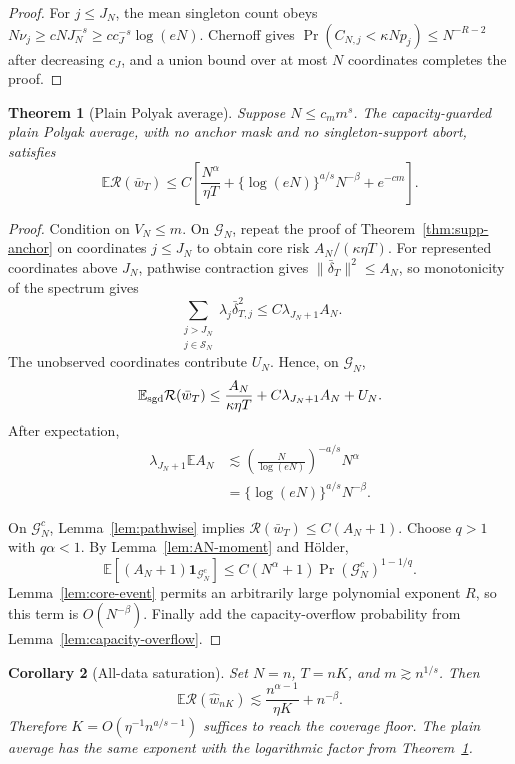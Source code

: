 \documentclass[letterpaper]{article}
\newtheorem{theorem}{Theorem}
\newtheorem{corollary}[theorem]{Corollary}
\newcommand{\E}{\mathbb E}
\newcommand{\R}{\mathcal R}
\newcommand{\cS}{\mathcal S}
\newcommand{\1}{\mathbf 1}
\begin{document}
\begin{proof}
For $j\le J_N$, the mean singleton count obeys
$N\nu_j\ge cN J_N^{-s}\ge c c_J^{-s}\log(eN)$. Chernoff gives
$\Pr(C_{N,j}<\kappa Np_j)\le N^{-R-2}$ after decreasing $c_J$, and a union
bound over at most $N$ coordinates completes the proof.
\end{proof}

\begin{theorem}[Plain Polyak average]
\label{thm:supp-plain}
Suppose $N\le c_mm^s$. The capacity-guarded plain Polyak average, with no
anchor mask and no singleton-support abort, satisfies
\[
\E\R(\bar w_T)
\le C\left[
\frac{N^\alpha}{\eta T}
+\{\log(eN)\}^{a/s}N^{-\beta}
+e^{-cm}
\right].
\]
\end{theorem}

\begin{proof}
Condition on $V_N\le m$. On $\mathcal G_N$, repeat the proof of
Theorem~\ref{thm:supp-anchor} on coordinates $j\le J_N$ to obtain core risk
$A_N/(\kappa\eta T)$. For represented coordinates above $J_N$, pathwise
contraction gives $\|\bar\delta_T\|^2\le A_N$, so monotonicity of the spectrum
gives
\[
\sum_{\substack{j>J_N\\j\in\cS_N}}
\lambda_j\bar\delta_{T,j}^2
\le C\lambda_{J_N+1}A_N.
\]
The unobserved coordinates contribute $U_N$. Hence, on $\mathcal G_N$,
\[
\E_{\rm sgd}\R(\bar w_T)
\le
\frac{A_N}{\kappa\eta T}
+C\lambda_{J_N+1}A_N+U_N.
\]
After expectation,
\begin{align*}
\lambda_{J_N+1}\E A_N
&\lesssim
\left(\frac{N}{\log(eN)}\right)^{-a/s}N^\alpha\\
&=\{\log(eN)\}^{a/s}N^{-\beta}.
\end{align*}

On $\mathcal G_N^c$, Lemma~\ref{lem:pathwise} implies
$\R(\bar w_T)\le C(A_N+1)$. Choose $q>1$ with $q\alpha<1$. By
Lemma~\ref{lem:AN-moment} and H\"older,
\[
\E[(A_N+1)\1_{\mathcal G_N^c}]
\le C(N^\alpha+1)\Pr(\mathcal G_N^c)^{1-1/q}.
\]
Lemma~\ref{lem:core-event} permits an arbitrarily large polynomial exponent
$R$, so this term is $O(N^{-\beta})$. Finally add the capacity-overflow
probability from Lemma~\ref{lem:capacity-overflow}.
\end{proof}

\begin{corollary}[All-data saturation]
\label{cor:supp-alldata}
Set $N=n$, $T=nK$, and $m\gtrsim n^{1/s}$. Then
\[
\E\R(\widehat w_{nK})
\lesssim
\frac{n^{\alpha-1}}{\eta K}+n^{-\beta}.
\]
Therefore $K=O(\eta^{-1}n^{a/s-1})$ suffices to reach the coverage floor.
The plain average has the same exponent with the logarithmic factor from
Theorem~\ref{thm:supp-plain}.
\end{corollary}
\end{document}
